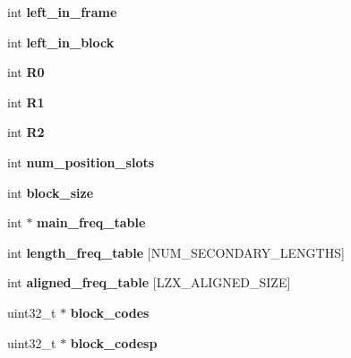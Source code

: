 \begin{DoxyCompactItemize}
int {\bfseries left\+\_\+in\+\_\+frame}
\item 
\mbox{\label{structlzx__data_ace7682055a04c9e279e97b958ceab4a4}} 
int {\bfseries left\+\_\+in\+\_\+block}
\item 
\mbox{\label{structlzx__data_af219aec78b3a117cc5e9fb23e754234a}} 
int {\bfseries R0}
\item 
\mbox{\label{structlzx__data_ac21b72164d91ec8bada57d7b0ffcb8ff}} 
int {\bfseries R1}
\item 
\mbox{\label{structlzx__data_a8e2b0421b16b813bd6f668c25440842e}} 
int {\bfseries R2}
\item 
\mbox{\label{structlzx__data_a2345d937f3c3ea2be7ede2d451fdee6f}} 
int {\bfseries num\+\_\+position\+\_\+slots}
\item 
\mbox{\label{structlzx__data_a91248831ee11405cdd2a274242a09627}} 
int {\bfseries block\+\_\+size}
\item 
\mbox{\label{structlzx__data_acf3783e115eda023af54e5da4df7db2b}} 
int $\ast$ {\bfseries main\+\_\+freq\+\_\+table}
\item 
\mbox{\label{structlzx__data_a5812c8053460ed558355b93bfc05db99}} 
int {\bfseries length\+\_\+freq\+\_\+table} \mbox{[}N\+U\+M\+\_\+\+S\+E\+C\+O\+N\+D\+A\+R\+Y\+\_\+\+L\+E\+N\+G\+T\+HS\mbox{]}
\item 
\mbox{\label{structlzx__data_ae39773068fa7da733d2f1f0c230c4386}} 
int {\bfseries aligned\+\_\+freq\+\_\+table} \mbox{[}L\+Z\+X\+\_\+\+A\+L\+I\+G\+N\+E\+D\+\_\+\+S\+I\+ZE\mbox{]}
\item 
\mbox{\label{structlzx__data_acfe89525d76d167c77832d8b159ceb08}} 
uint32\+\_\+t $\ast$ {\bfseries block\+\_\+codes}
\item 
\mbox{\label{structlzx__data_a5a8409fe1f5adadd1d93e4f73c667251}} 
uint32\+\_\+t $\ast$ {\bfseries block\+\_\+codesp}
\item 
\mbox{\label{structlzx__data_afd949a41734629ef69c5661e476c4561}} 

\end{DoxyCompactItemize}
